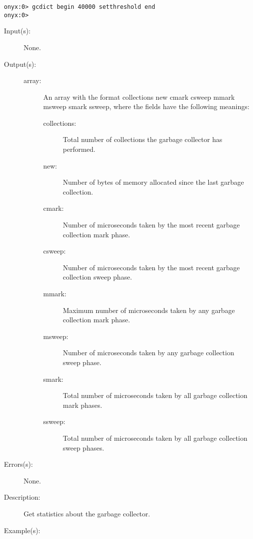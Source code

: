 \begin{description}
\begin{description}
\begin{verbatim}
onyx:0> gcdict begin 40000 setthreshold end
onyx:0>
		\end{verbatim}
	\end{description}
\label{gcdict:stats}
\item[{\onyxop{--}{stats}{array}}: ]
	\begin{description}\item[]
	\item[Input(s): ] None.
	\item[Output(s): ]
		\begin{description}\item[]
		\item[array: ]
			An array with the format {\lb}collections new {\lb}cmark
			csweep{\rb} {\lb}mmark msweep{\rb} {\lb}smark
			ssweep{\rb}{\rb}, where the fields have the following
			meanings:
			\begin{description}\item[]
			\item[collections: ]
				Total number of collections the garbage
				collector has performed.
			\item[new: ]
				Number of bytes of memory allocated since the
				last garbage collection.
			\item[cmark: ]
				Number of microseconds taken by the most recent
				garbage collection mark phase.
			\item[csweep: ]
				Number of microseconds taken by the most recent
				garbage collection sweep phase.
			\item[mmark: ]
				Maximum number of microseconds taken by any
				garbage collection mark phase.
			\item[msweep: ]
				Number of microseconds taken by any garbage
				collection sweep phase.
			\item[smark: ]
				Total number of microseconds taken by all
				garbage collection mark phases.
			\item[ssweep: ]
				Total number of microseconds taken by all
				garbage collection sweep phases.
			\end{description}
		\end{description}
	\item[Errors(s): ] None.
	\item[Description: ]
		Get statistics about the garbage collector.
	\item[Example(s): ]\begin{verbatim}


\end{verbatim}
\end{description}
\end{description}
